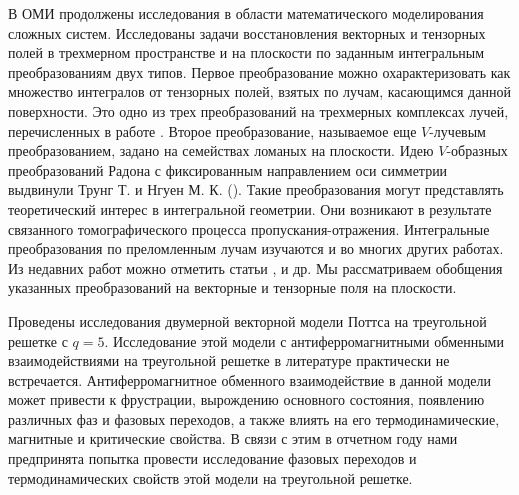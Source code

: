 В ОМИ продолжены исследования в области математического моделирования сложных систем. Исследованы задачи восстановления векторных и тензорных полей в трехмерном пространстве и на плоскости по заданным интегральным преобразованиям двух типов. Первое преобразование можно охарактеризовать как множество интегралов от тензорных полей, взятых по лучам, касающимся данной поверхности. Это одно из трех преобразований на трехмерных комплексах лучей, перечисленных в работе \cite{Medzhidov}.
Второе преобразование, называемое еще $V$-лучевым преобразованием, задано на семействах ломаных на плоскости. Идею $V$-образных преобразований Радона с фиксированным направлением оси симметрии выдвинули Трунг Т. и Нгуен М. К. (\cite{Truong}). Такие преобразования могут представлять теоретический интерес в интегральной геометрии. Они возникают в результате связанного томографического процесса пропускания-отражения. Интегральные преобразования по преломленным лучам изучаются и во многих других работах. Из недавних работ можно отметить статьи \cite{Sharafutdinov}, \cite{Ambartsoumian}  и др.
Мы рассматриваем обобщения указанных преобразований на векторные и тензорные поля на плоскости.

Проведены исследования двумерной векторной модели Поттса на треугольной решетке с $q = 5$. Исследование этой модели с антиферромагнитными обменными взаимодействиями на треугольной решетке в литературе практически не встречается. Антиферромагнитное обменного взаимодействие в данной модели может привести к фрустрации, вырождению основного состояния, появлению различных фаз и фазовых переходов, а также влиять на его термодинамические, магнитные и критические свойства. В связи с этим в отчетном году нами предпринята попытка провести исследование фазовых переходов и термодинамических свойств этой модели на треугольной решетке. 